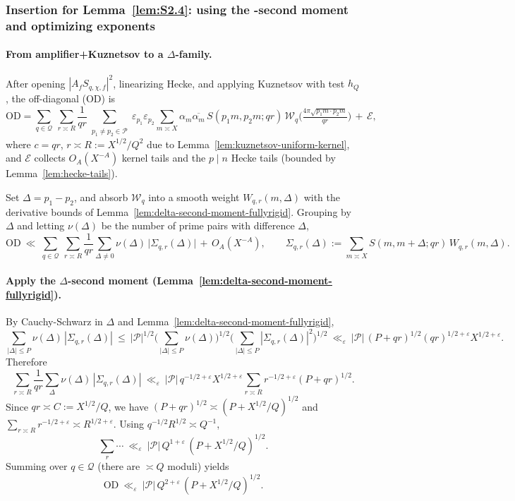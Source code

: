 \documentclass[11pt]{article}
\theoremstyle{definition}
\theoremstyle{remark}
\numberwithin{equation}{part}
\begin{document}
\subsubsection{Insertion for Lemma~\ref{lem:S2.4}: using the \textDelta-second moment and optimizing exponents}

\paragraph{From amplifier+Kuznetsov to a $\Delta$-family.}
After opening $|A_f S_{q,\chi,f}|^2$, linearizing Hecke, and applying Kuznetsov with test $h_Q$, the off-diagonal (OD) is
\[
	\mathrm{OD}
	=\sum_{q\in\mathcal Q}\ \sum_{r\asymp R}\frac{1}{qr}
	\!\!\sum_{\substack{p_1\ne p_2\in\mathcal P}}\!\!\varepsilon_{p_1}\varepsilon_{p_2}\!
	\sum_{m\asymp X}\alpha_m\overline{\alpha_{m}}\,
	S(p_1m,p_2m;qr)\,\mathcal W_{q}\!\Big(\tfrac{4\pi\sqrt{p_1m\cdot p_2m}}{qr}\Big)\,+\,\mathcal E,
\]
where $c=qr$, $r\asymp R:=X^{1/2}/Q^{2}$ due to Lemma~\ref{lem:kuznetsov-uniform-kernel},
and $\mathcal E$ collects $O_A(X^{-A})$ kernel tails and the $p\mid n$ Hecke tails
(bounded by Lemma~\ref{lem:hecke-tails}).


Set $\Delta=p_1-p_2$, and absorb $\mathcal W_q$ into a smooth weight $W_{q,r}(m,\Delta)$ with the derivative bounds of Lemma~\ref{lem:delta-second-moment-fullyrigid}. Grouping by $\Delta$ and letting $\nu(\Delta)$ be the number of prime pairs with difference $\Delta$,
\[
	\mathrm{OD}\ \ll\ \sum_{q\in\mathcal Q}\ \sum_{r\asymp R}\frac{1}{qr}\sum_{\Delta\ne 0}\nu(\Delta)\,
	\Big|\Sigma_{q,r}(\Delta)\Big| \,+\, O_A(X^{-A}),\qquad
	\Sigma_{q,r}(\Delta):=\sum_{m\asymp X} S(m,m+\Delta;qr)\,W_{q,r}(m,\Delta).
\]

\paragraph{Apply the $\Delta$-second moment (Lemma~\ref{lem:delta-second-moment-fullyrigid}).}
By Cauchy-Schwarz in $\Delta$ and Lemma~\ref{lem:delta-second-moment-fullyrigid},
\[
	\sum_{|\Delta|\le P}\nu(\Delta)\,|\Sigma_{q,r}(\Delta)|
	\ \le\ |\mathcal P|^{1/2}\Big(\sum_{|\Delta|\le P}\nu(\Delta)\Big)^{1/2}
	\Big(\sum_{|\Delta|\le P}|\Sigma_{q,r}(\Delta)|^2\Big)^{1/2}
	\ \ll_\varepsilon\ |\mathcal P|\,(P+qr)^{1/2}(qr)^{1/2+\varepsilon}X^{1/2+\varepsilon}.
\]
Therefore
\[
	\sum_{r\asymp R}\frac{1}{qr}\sum_{\Delta}\nu(\Delta)\,|\Sigma_{q,r}(\Delta)|
	\ \ll_\varepsilon\ |\mathcal P|\,q^{-1/2+\varepsilon}X^{1/2+\varepsilon}\!\!\sum_{r\asymp R} r^{-1/2+\varepsilon}(P+qr)^{1/2}.
\]
Since $qr\asymp C:=X^{1/2}/Q$, we have $(P+qr)^{1/2}\asymp (P+X^{1/2}/Q)^{1/2}$ and $\sum_{r\asymp R} r^{-1/2+\varepsilon}\asymp R^{1/2+\varepsilon}$. Using $q^{-1/2}R^{1/2}\asymp Q^{-1}$,
\[
	\sum_{r}\cdots\ \ll_\varepsilon\ |\mathcal P|\,Q^{1+\varepsilon}\,(P+X^{1/2}/Q)^{1/2}.
\]
Summing over $q\in\mathcal Q$ (there are $\asymp Q$ moduli) yields
\begin{equation}\label{eq:OD-final}
	\mathrm{OD}\ \ll_\varepsilon\ |\mathcal P|\,Q^{2+\varepsilon}\,(P+X^{1/2}/Q)^{1/2}.
\end{equation}
\end{document}
